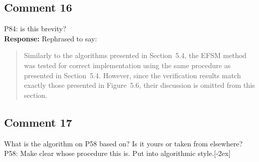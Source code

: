\documentclass[10pt,a4paper,notitlepage]{article}
\numberwithin{equation}{section}
\begin{document}
\subsection{Comment 16}
P84: is this brevity?\\[-2ex]

\textbf{Response:}
Rephrased to say:
\begin{quote}
Similarly to the algorithms presented in Section~5.4, the EFSM method was tested for correct implementation using the same procedure as presented in Section~5.4. However, since the verification results match exactly those presented in Figure~5.6, their discussion is omitted from this section.
\end{quote}

\subsection{Comment 17}
What is the algorithm on P58 based on? Is it yours or taken from elsewhere? P58: Make clear whose procedure this is. Put into algorithmic style.[-2ex]
\end{document}
